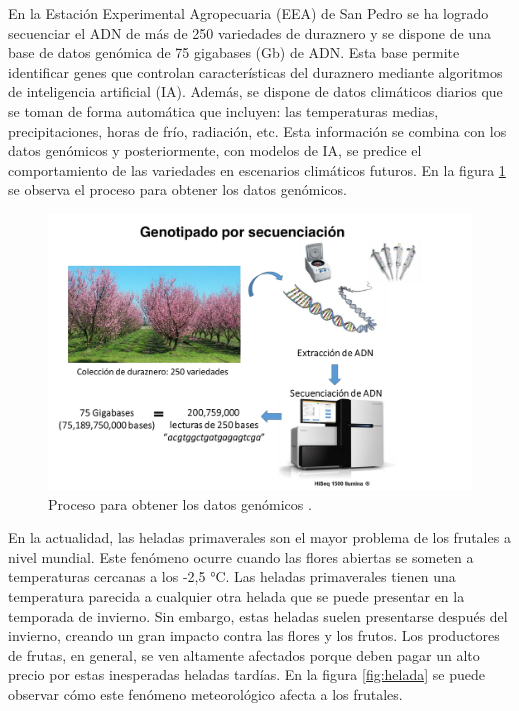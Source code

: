 En la  Estación Experimental Agropecuaria (EEA) de San Pedro se ha logrado secuenciar el ADN de más de 250 variedades de duraznero \cite{ARTICLE:1} y se dispone de una base de datos genómica de 75 gigabases (Gb) de ADN. Esta base permite identificar genes que controlan características del duraznero mediante algoritmos de inteligencia artificial (IA). Además, se dispone de datos climáticos diarios que se toman de forma automática que incluyen: las temperaturas medias, precipitaciones, horas de frío, radiación, etc. Esta información se combina con los datos genómicos y posteriormente, con modelos de IA, se predice el comportamiento de las variedades en escenarios climáticos futuros. En la figura \ref{fig:genotipado} se observa el proceso para obtener los datos genómicos.

\begin{figure}[h]
	\centering
	\includegraphics[scale=.3]{./Figures/genotipado.png}
	\caption{Proceso para obtener los datos genómicos \protect\footnotemark.}
	\label{fig:genotipado}
\end{figure}

\newpage
{}

En la actualidad, las heladas primaverales son el mayor problema de los frutales a nivel mundial. Este fenómeno ocurre cuando las flores abiertas se someten a temperaturas cercanas a los -2,5 °C. Las heladas primaverales tienen una temperatura parecida a cualquier otra helada que se puede presentar en la temporada de invierno. Sin embargo, estas heladas suelen presentarse después del invierno, creando un gran impacto contra las flores y los frutos. Los productores de frutas, en general, se ven altamente afectados porque deben pagar un alto precio por estas inesperadas heladas tardías. En la figura \ref{fig:helada} se puede observar cómo este fenómeno meteorológico afecta a los frutales.

